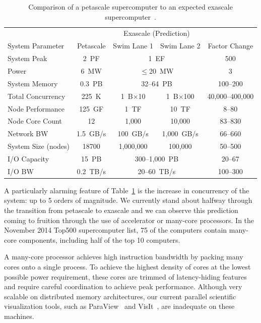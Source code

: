 \documentclass{superfri}
\newcommand*{\lcite}[1]{~\cite{#1}}
\begin{document}
\begin{table}[htdp]
  \centering
  \caption{Comparison of a petascale supercomputer to an expected exascale
    supercomputer\lcite{ScientificDiscoveryExascale2011}.}
  \label{table:PetascaleVsExascale}
  \begin{tabular}{@{}lcccc@{}}
    \toprule
    & & \multicolumn{2}{c}{Exascale (Prediction)} & \\
    System Parameter & Petascale & Swim Lane 1 & Swim Lane 2 & Factor Change \\
    \midrule
    System Peak & 2~PF & \multicolumn{2}{c}{1~EF} & 500 \\
    Power & 6~MW & \multicolumn{2}{c}{$\le$20~MW} & 3\\
    System Memory & 0.3~PB & \multicolumn{2}{c}{32--64~PB} & 100--200 \\ %
    Total Concurrency & 225~K & 1~B$\times$10 & 1~B$\times$100 & 40,000--400,000 \\
    Node Performance & 125~GF & 1~TF & 10~TF & 8--80\\
    Node Core Count & 12 & 1,000 & 10,000 & 83--830 \\
    Network BW & 1.5~GB/s & 100~GB/s & 1,000~GB/s & 66--660 \\
    System Size (nodes) & 18700 & 1,000,000 & 100,000 & 50--500 \\
    I/O Capacity & 15~PB & \multicolumn{2}{c}{300--1,000~PB} & 20--67\\
    I/O BW & 0.2~TB/s & \multicolumn{2}{c}{20--60~TB/s} & 100--300 \\
    \bottomrule
  \end{tabular}
\end{table}

A particularly alarming feature of Table~\ref{table:PetascaleVsExascale} is
the increase in concurrency of the system: up to 5 orders of magnitude. We
currently stand about halfway through the transition from petascale to
exascale and we can observe this prediction coming to fruition through the
use of accelerator or many-core processors. In the November 2014 Top500
supercomputer list, 75 of the computers contain many-core components,
including half of the top 10 computers.

A many-core processor achieves high instruction bandwidth by packing many
cores onto a single process. To achieve the highest density of cores at the
lowest possible power requirement, these cores are trimmed of
latency-hiding features and require careful coordination to achieve peak
performance. Although very scalable on distributed memory architectures,
our current parallel scientific visualization tools, 
such as ParaView\lcite{ParaView} and VisIt\lcite{VisIt},
 are inadequate on these machines.
\end{document}
